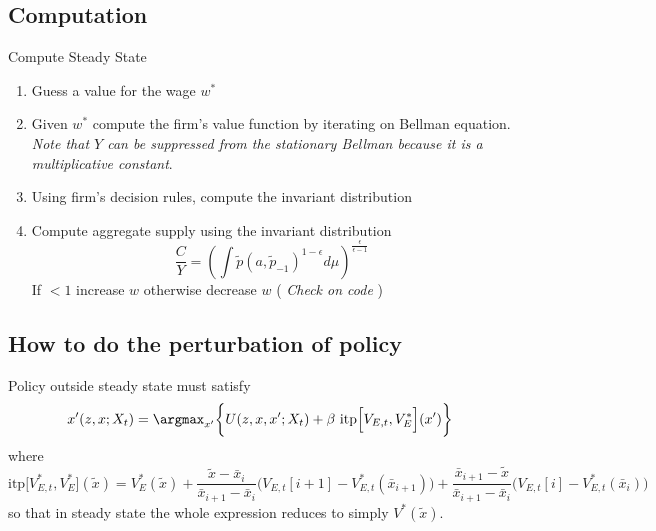 \documentclass[a4paper,10pt]{article}  %
\begin{document}
\subsection{Computation} %
\label{sub:computation}

Compute Steady State
\begin{enumerate}
   
   \item Guess a value for the wage $ w^* $
   \item Given $ w^* $ compute the firm's value function by iterating on Bellman equation. 
   \emph{Note that $ Y $ can be suppressed from the stationary Bellman because it is a multiplicative
      constant}. 
   \item Using firm's decision rules, compute the invariant distribution
   \item Compute aggregate supply using the invariant distribution 
   \[
      \frac{C}{Y} = \left( \int  \tilde{p}(a,\tilde{p}_{-1})^{1 -\epsilon} d\mu \right)^{ \frac{\epsilon}{\epsilon-1} }
   \]
   If $ <1 $ increase $ w $ otherwise decrease $ w $ ( {\em \color{blue} Check on code} )
\end{enumerate}


\subsection{How to do the perturbation of policy} %
\label{sub:how_to_do_the_perturbation_of_policy}

Policy outside steady state must satisfy
\begin{equation}
   \label{eq:maximization_prob}
   x'(z,x; X_t ) = \argmax_{x'} \bigg\{ U(z,x,x'; X_t) + \beta \  \text{itp} \Big[ V_{E,t} , V_{E}^* \Big]( x' ) \bigg\}
\end{equation}
where
\begin{equation}
   \label{eq:interpol}
   \text{itp} \Big[ V_{E,t}^*, V_{E}^{*} \Big]( \tilde{x} ) = V_{E}^*( \tilde{x} ) + 
      \frac{ \tilde{x} - \bar{x}_i }{ \bar{x}_{i+1} - \bar{x}_i } \Big( V_{E,t}[i+1] - V_{E,t}^{*}(\bar{x}_{i+1}) \Big) +
      \frac{ \bar{x}_{i+1} -\tilde{x} }{ \bar{x}_{i+1} - \bar{x}_i } \Big( V_{E,t}[i] - V_{E,t}^{*}(\bar{x}_i) \Big)
\end{equation}
so that in steady state the whole expression reduces to simply $ V^*( \tilde{x} ) $.
\end{document}
